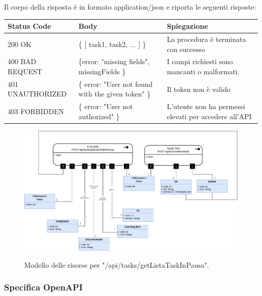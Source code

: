 \documentclass{report}
\begin{document}
Il corpo della risposta è in formato application/json e riporta le seguenti risposte:

\begin{center} %
	\centering
	\begin{tabular}{ |p{4cm}|p{4cm}|p{4cm}| }
		\hline
		\centering Status Code & \qquad\qquad\quad Body & \qquad\quad Spiegazione\\ %
		\hline
		200 OK & \{ [ task1, task2, ... ] \}  & La procedura è terminata con successo	\\ 
		\hline
		400 BAD REQUEST & \{error: "missing fields", missingFields \} & I campi richiesti sono mancanti o malformati. \\
		\hline
		401 UNAUTHORIZED & \{ error: "User not found with the given token" \} & Il token non è valido \\
		\hline
		403 FORBIDDEN & \{ error: "User not authorized" \} &  L'utente non ha permessi elevati per accedere all'API \\
		\hline
	\end{tabular}
\end{center}

\begin{figure}[H]
	\centering\includegraphics[width=1\textwidth]{images/model_in_pausa.png}
	
	Modello delle risorse per "/api/tasks/getListaTaskInPausa".
\end{figure}

\subsubsection*{Specifica OpenAPI}
\end{document}
